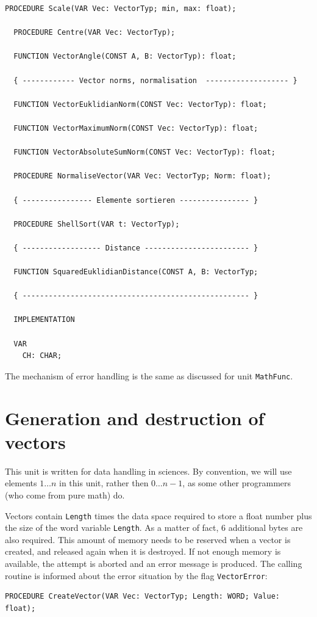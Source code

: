 \begin{refsection}
\begin{lstlisting}[caption=Interface of unit Vector]
  PROCEDURE Scale(VAR Vec: VectorTyp; min, max: float);

  PROCEDURE Centre(VAR Vec: VectorTyp);

  FUNCTION VectorAngle(CONST A, B: VectorTyp): float;

  { ------------ Vector norms, normalisation  ------------------- }

  FUNCTION VectorEuklidianNorm(CONST Vec: VectorTyp): float;

  FUNCTION VectorMaximumNorm(CONST Vec: VectorTyp): float;

  FUNCTION VectorAbsoluteSumNorm(CONST Vec: VectorTyp): float;

  PROCEDURE NormaliseVector(VAR Vec: VectorTyp; Norm: float);

  { ---------------- Elemente sortieren ---------------- }

  PROCEDURE ShellSort(VAR t: VectorTyp);

  { ------------------ Distance ------------------------ }

  FUNCTION SquaredEuklidianDistance(CONST A, B: VectorTyp;

  { ---------------------------------------------------- }

  IMPLEMENTATION

  VAR
    CH: CHAR;
\end{lstlisting}
The mechanism of error handling is the same as discussed for unit \texttt{MathFunc}.

\section{Generation and destruction of vectors}

This unit is written for data handling in sciences. By convention, we will use elements \(1\ldots n \) in this unit, rather then \(0\ldots n-1 \), as some other programmers (who come from pure math) do.

Vectors contain \texttt{Length} times the data space required to store a float number plus the size of the word variable \texttt{Length}. As a matter of fact, 6 additional bytes are also required. This amount of memory needs to be reserved when a vector is created, and released again when it is destroyed. If not enough memory is available, the attempt is aborted and an error message is produced. The calling routine is informed about the error situation by the flag \texttt{VectorError}:
\begin{lstlisting}[caption=eneration and destruction of vectors]
  PROCEDURE CreateVector(VAR Vec: VectorTyp; Length: WORD; Value: float);


\end{lstlisting}
\end{refsection}
